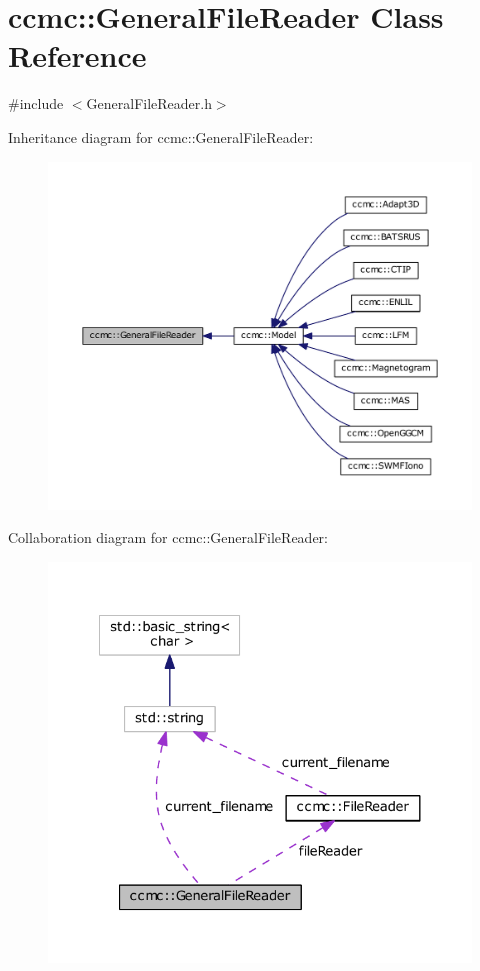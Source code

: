 \hypertarget{classccmc_1_1_general_file_reader}{\section{ccmc\-:\-:General\-File\-Reader Class Reference}
\label{classccmc_1_1_general_file_reader}
}


{\ttfamily \#include $<$General\-File\-Reader.\-h$>$}



Inheritance diagram for ccmc\-:\-:General\-File\-Reader\-:
\nopagebreak
\begin{figure}[H]
\begin{center}
\leavevmode
\includegraphics[width=350pt]{classccmc_1_1_general_file_reader__inherit__graph}
\end{center}
\end{figure}


Collaboration diagram for ccmc\-:\-:General\-File\-Reader\-:
\nopagebreak
\begin{figure}[H]
\begin{center}
\leavevmode
\includegraphics[width=324pt]{classccmc_1_1_general_file_reader__coll__graph}
\end{center}
\end{figure}
